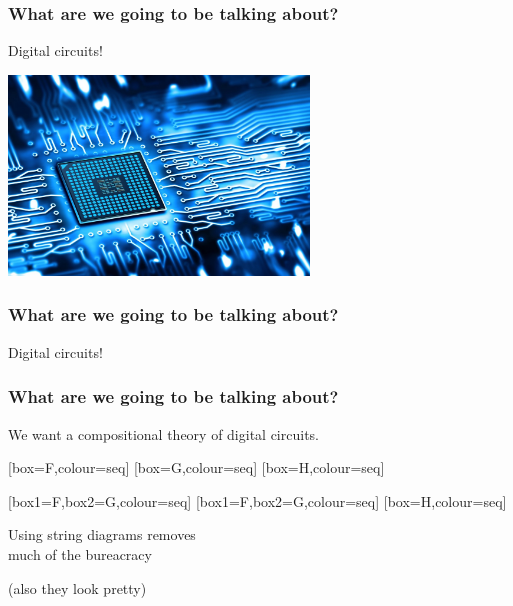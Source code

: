\begin{frame}
    \frametitle{What are we going to be talking about?}
    \pause
    \centering
    \LARGE
    Digital circuits!

    \includegraphics[width=0.6\textwidth]{imgs/circuit}
\end{frame}
\begin{frame}
    \frametitle{What are we going to be talking about?}
    \centering
    \LARGE
    Digital circuits!

    \vspace{1em}
    \normalsize

\end{frame}
\begin{frame}
    \frametitle{What are we going to be talking about?}

    \centering
    \Large
    We want a \alert{compositional} theory of digital circuits.

    \vspace{1em}

    \normalsize

    \pause
    [box=F,colour=seq]
    \pause
    \quad
    [box=G,colour=seq]
    \pause
    \quad
    [box=H,colour=seq]

    \pause
    \vspace{1em}

    [box1=F,box2=G,colour=seq]
    \quad
    [box1=F,box2=G,colour=seq]
    \quad
    [box=H,colour=seq]

    \pause

    \Large
    \vspace{1em}

    Using \alert{string diagrams} removes \\ much of the bureacracy

    \pause

    \normalsize

    (also they look pretty)

\end{frame}

